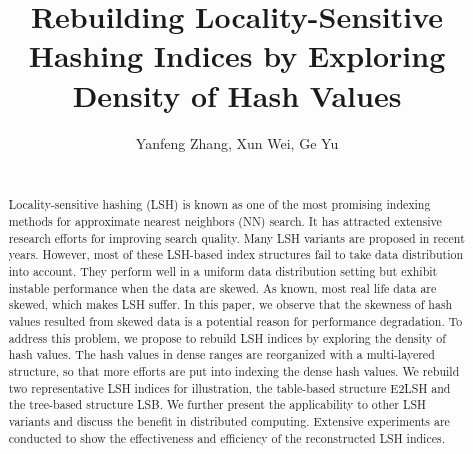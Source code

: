 \documentclass{vldb}
\begin{document}
\newcommand{\Paragraph}[1]{\smallskip{\bf #1.}}
\newcommand{\Paragraphnopunc}[1]{\smallskip\noindent{\bf #1}}
\newcommand{\Paragraphwithindent}[1]{\smallskip{\bf #1.}}
\newcommand{\tabincell}[2]{\begin{tabular}{@{}#1@{}}#2\end{tabular}}
\newcommand{\argmin}{\text{arg}\,\text{min}}
\newcommand{\argmax}{\text{arg}\,\text{max}}

\newtheorem{definition}{Definition}
\newtheorem{prop}{Proposition}
\newtheorem{lemma}{Lemma}
\newtheorem{theorem}{Theorem}


\title{Rebuilding Locality-Sensitive Hashing Indices by Exploring Density of Hash Values}
\author{
\alignauthor
Yanfeng Zhang, Xun Wei, Ge Yu\\
      \\
}
\date{}
\maketitle

\begin{abstract}
Locality-sensitive hashing (LSH) is known as one of the most promising indexing methods for approximate nearest neighbors (NN) search. It has attracted extensive research efforts for improving search quality. Many LSH variants are proposed in recent years. However, most of these LSH-based index structures fail to take data distribution into account. They perform well in a uniform data distribution setting but exhibit instable performance when the data are skewed. As known, most real life data are skewed, which makes LSH suffer. In this paper, we observe that the skewness of hash values resulted from skewed data is a potential reason for performance degradation. To address this problem, we propose to rebuild LSH indices by exploring the density of hash values. The hash values in dense ranges are reorganized with a multi-layered structure, so that more efforts are put into indexing the dense hash values. We rebuild two representative LSH indices for illustration, the table-based structure E2LSH and the tree-based structure LSB. We further present the applicability to other LSH variants and discuss the benefit in distributed computing. Extensive experiments are conducted to show the effectiveness and efficiency of the reconstructed LSH indices.
\end{abstract}

















\end{document}
